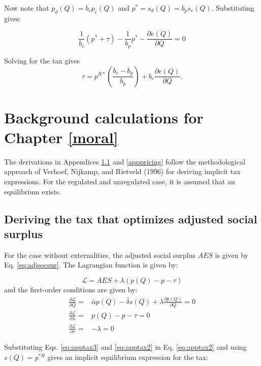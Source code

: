 \documentclass[
]{book}
\begin{document}
Now note that \(p_d (Q)=b_c p_e (Q)\) and \(p^*=s_d (Q)=b_p s_e (Q)\). Substituting gives:

\begin{equation}
\frac{1}{b_c} (p^* + \tau) - \frac{1}{b_p}p^* -\frac{\partial e(Q)}{\partial Q} = 0
\end{equation}

Solving for the tax gives
\begin{equation}
\tau = p^{R*} \left(\frac{b_c - b_p}{b_p}\right) + b_c \frac{\partial e(Q)}{\partial Q}.
\end{equation}

\hypertarget{background-calculations-for-chapter-refmoral}{%
\chapter{Background calculations for Chapter \ref{moral}}\label{background-calculations-for-chapter-refmoral}}

The derivations in Appendices \ref{apptax} and \ref{apppricing} follow the methodological approach of Verhoef, Nijkamp, and Rietveld (1996) for deriving implicit tax expressions. For the regulated and unregulated case, it is assumed that an equilibrium exists.

\hypertarget{apptax}{%
\section{Deriving the tax that optimizes adjusted social surplus}\label{apptax}}

For the case without externalities, the adjusted social surplus \(AES\) is given by Eq. \eqref{eq:adjsocsur}. The Lagrangian function is given by:

\begin{equation}
\mathcal{L} = AES  + \lambda(p(Q) - p - \tau)
\end{equation}
and the first-order conditions are given by:
\begin{align}
  \frac{\partial \mathcal{L}}{\partial Q} =& \bar{\alpha} p(Q) - \bar{\delta} s(Q) + \lambda \frac{\partial p(Q)}{\partial Q} = 0 \label{eq:apptax1}\\
  \frac{\partial \mathcal{L}}{\partial \lambda} =& p(Q) - p - \tau = 0 \label{eq:apptax2}\\
  \frac{\partial \mathcal{L}}{\partial \tau} =& - \lambda = 0 \label{eq:apptax3}
\end{align}

Substituting Eqs. \eqref{eq:apptax3} and \eqref{eq:apptax2} in Eq. \eqref{eq:apptax2} and using \(s(Q)=p^{*R}\) gives an implicit equilibrium expression for the tax:
\end{document}
